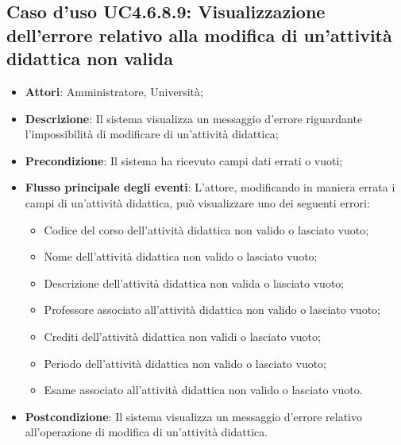 \subsection{Caso d'uso \texorpdfstring{UC4.6.8.9}{UC4.6.8.9}: Visualizzazione dell'errore relativo alla modifica di un’attività didattica non valida}
\begin{itemize}
	\item \textbf{Attori}: Amministratore, Università;
	\item \textbf{Descrizione}: Il sistema visualizza un messaggio d'errore riguardante l'impossibilità di modificare di un'attività didattica;
	
	\item \textbf{Precondizione}: Il sistema ha ricevuto campi dati errati o vuoti;
	
	\item \textbf{Flusso principale degli eventi}: L'attore, modificando in maniera errata i campi di un'attività didattica, può visualizzare uno dei seguenti errori: 
	\begin{itemize} 
		\item Codice del corso dell’attività didattica non valido o lasciato vuoto; 
		\item Nome dell’attività didattica non valido o lasciato vuoto;
		\item Descrizione dell’attività didattica non valida o lasciato vuoto; 
		\item Professore associato all’attività didattica non valido o lasciato vuoto;
		\item Crediti dell’attività didattica non validi o lasciato vuoto; 
		\item Periodo dell’attività didattica non valido o lasciato vuoto; 
		\item Esame associato all’attività didattica non valido o lasciato vuoto. 
	\end{itemize}
	\item \textbf{Postcondizione}: Il sistema visualizza un messaggio d'errore relativo all'operazione di modifica di un'attività didattica.
	
	
\end{itemize}
